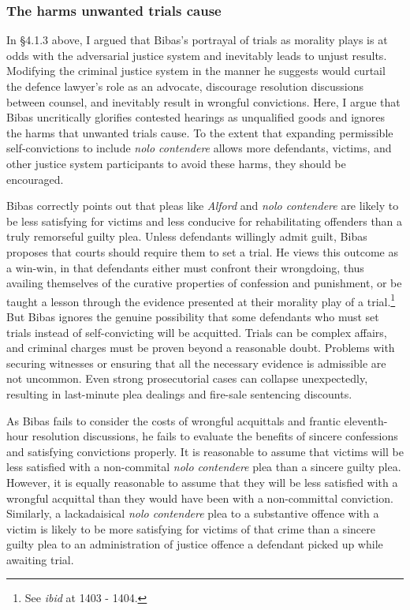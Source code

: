 \subsubsection{The harms unwanted trials cause}

In \S 4.1.3 above, I argued that Bibas's portrayal of trials as morality plays is at odds with the adversarial justice system and inevitably leads to unjust results. Modifying the criminal justice system in the manner he suggests would curtail the defence lawyer's role as an advocate, discourage resolution discussions between counsel, and inevitably result in wrongful convictions. Here, I argue that Bibas uncritically glorifies contested hearings as unqualified goods and ignores the harms that unwanted trials cause. To the extent that expanding permissible self-convictions to include \textit{nolo contendere} allows more defendants, victims, and other justice system participants to avoid these harms, they should be encouraged.

Bibas correctly points out that pleas like \textit{Alford} and \textit{nolo contendere} are likely to be less satisfying for victims and less conducive for rehabilitating offenders than a truly remorseful guilty plea. Unless defendants willingly admit guilt, Bibas proposes that courts should require them to set a trial. He views this outcome as a win-win, in that defendants either must confront their wrongdoing, thus availing themselves of the curative properties of confession and punishment, or be taught a lesson through the evidence presented at their morality play of a trial.\footnote{See \textit{ibid} at 1403 - 1404.} But Bibas ignores the genuine possibility that some defendants who must set trials instead of self-convicting will be acquitted. Trials can be complex affairs, and criminal charges must be proven beyond a reasonable doubt. Problems with securing witnesses or ensuring that all the necessary evidence is admissible are not uncommon. Even strong prosecutorial cases can collapse unexpectedly, resulting in last-minute plea dealings and fire-sale sentencing discounts. 

As Bibas fails to consider the costs of wrongful acquittals and frantic eleventh-hour resolution discussions, he fails to evaluate the benefits of sincere confessions and satisfying convictions properly. It is reasonable to assume that victims will be less satisfied with a non-commital \textit{nolo contendere} plea than a sincere guilty plea. However, it is equally reasonable to assume that they will be less satisfied with a wrongful acquittal than they would have been with a non-committal conviction. Similarly, a lackadaisical \textit{nolo contendere} plea to a substantive offence with a victim is likely to be more satisfying for victims of that crime than a sincere guilty plea to an administration of justice offence a defendant picked up while awaiting trial. 

